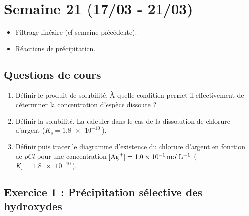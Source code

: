 \section{Semaine 21 (17/03 - 21/03) }


\begin{itemize}
	\item Filtrage linéaire (cf semaine précédente).
	\item Réactions de précipitation.
\end{itemize}

\subsection{Questions de cours}

\begin{enumerate}
	\item Définir le produit de solubilité. À quelle condition permet-il effectivement de déterminer la concentration d'espèce dissoute ?
	\item Définir la solubilité. La calculer dans le cas de la dissolution de chlorure d'argent ($K_s = \SI{1.8e-10}{}$).
	\item Définir puis tracer le diagramme d'existence du chlorure d'argent en fonction de $pCl$ pour une concentration $[\ce{Ag+}] = \SI{1.0e-1}{\mole\per\liter}$ ($K_s = \SI{1.8e-10}{}$).
\end{enumerate}


\subsection{Exercice 1 : Précipitation sélective des hydroxydes}

